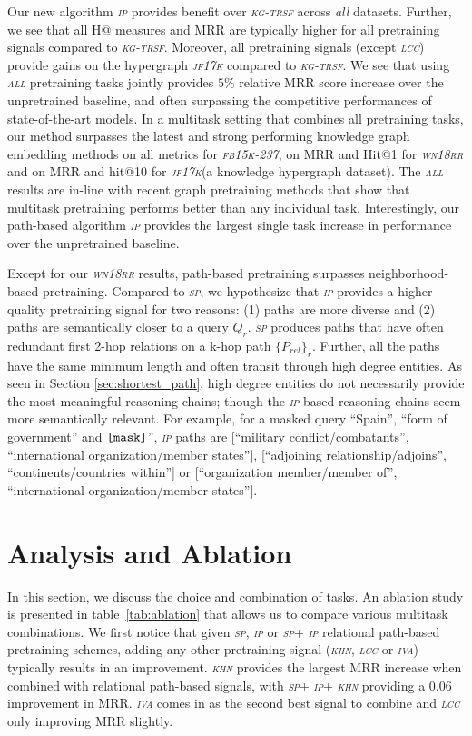 \documentclass{article}
\newcommand{\kgtrsf}{\textsl{\textsc{kg-trsf}}\xspace}
\newcommand{\wnrr}{\textsl{\textsc{wn18rr}}\xspace}
\newcommand{\fb}{\textsl{\textsc{fb15k-237}}\xspace}
\newcommand{\jf}{\textsl{\textsc{jf17k}}\xspace}
\newcommand{\spa}{\textsl{\textsc{sp}}\xspace}
\newcommand{\ipa}{\textsl{\textsc{ip}}\xspace}
\newcommand{\hn}{\textsl{\textsc{khn}}\xspace}
\newcommand{\lcc}{\textsl{\textsc{lcc}}\xspace}
\newcommand{\iva}{\textsl{\textsc{iva}}\xspace}
\newcommand{\all}{\textsl{\textsc{all}}\xspace}
\newcommand{\mask}{\mbox{\texttt{[mask]}}}
\begin{document}
Our new algorithm \ipa provides benefit over \kgtrsf across \emph{all} datasets. 
Further, we see that all H@ measures and MRR are typically higher for all pretraining signals compared to \kgtrsf.
Moreover, all pretraining signals (except \lcc) provide gains on the hypergraph \jf compared to \kgtrsf.
We see that using \all pretraining tasks jointly provides $5$\% relative MRR score increase over the unpretrained baseline, and often surpassing the competitive performances of state-of-the-art models.
In a multitask setting that combines all pretraining tasks, our method surpasses the latest and strong performing knowledge graph embedding methods on all metrics for \fb, on MRR and Hit@1 for \wnrr and on MRR and hit@10 for \jf (a knowledge hypergraph dataset).
The \all results are in-line with recent graph pretraining methods \cite{Hu_2020Strategies,gpt_gnn2020} that show that multitask pretraining performs better than any individual task.
Interestingly, our path-based algorithm \ipa provides the largest single task increase in performance over the unpretrained baseline.

Except for our \wnrr results, path-based pretraining surpasses neighborhood-based pretraining.
Compared to \spa, we hypothesize that \ipa provides a higher quality pretraining signal for two reasons: (1) paths are more diverse and (2) paths are semantically closer to a query $Q_r$. 
\spa produces paths that have often redundant first 2-hop relations on a k-hop path $\{P_{rel}\}_{r}$.
Further, all the paths have the same minimum length and often transit through high degree entities.
As seen in Section \ref{sec:shortest_path}, high degree entities do not necessarily provide the most meaningful reasoning chains; though the \ipa-based reasoning chains seem more semantically relevant. 
For example, for a masked query ``Spain'', ``form of government'' and $\mask{}$'', \ipa paths are [``military conflict/combatants'', ``international organization/member states''], [``adjoining relationship/adjoins'', ``continents/countries within''] or [``organization member/member of'', ``international organization/member states''].


\section{Analysis and Ablation}
\label{sec:ablation}
In this section, we discuss the choice and combination of tasks. An ablation study is presented in table~\ref{tab:ablation} that allows us to compare various multitask combinations. We first notice that given \spa, \ipa or \spa + \ipa relational path-based pretraining schemes, adding any other pretraining signal (\hn, \lcc or \iva) typically results in an improvement. \hn provides the largest MRR increase when combined with relational path-based signals, with \spa + \ipa + \hn providing a 0.06 improvement in MRR. \iva comes in as the second best signal to combine and \lcc only improving MRR slightly. 
\end{document}

